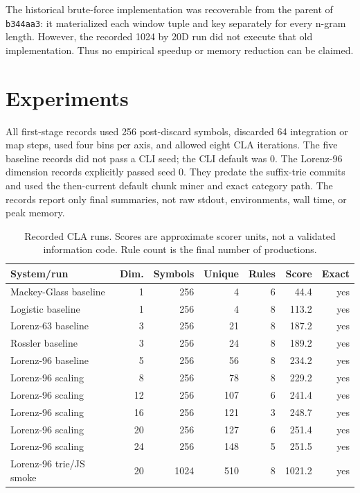 \documentclass[11pt]{article}
\begin{document}
The historical brute-force implementation was recoverable from the parent of
\texttt{b344aa3}: it materialized each window tuple and key separately for every
n-gram length. However, the recorded 1024 by 20D run did not execute that old
implementation. Thus no empirical speedup or memory reduction can be claimed.

\section{Experiments}

All first-stage records used 256 post-discard symbols, discarded 64 integration
or map steps, used four bins per axis, and allowed eight CLA iterations. The
five baseline records did not pass a CLI seed; the CLI default was 0. The
Lorenz-96 dimension records explicitly passed seed 0. They predate the
suffix-trie commits and used the then-current default chunk miner and exact
category path. The records report only final summaries, not raw stdout,
environments, wall time, or peak memory.

\begin{table}[ht]
\centering
\small
\begin{tabular}{lrrrrrr}
\toprule
System/run & Dim. & Symbols & Unique & Rules & Score & Exact \\
\midrule
Mackey-Glass baseline & 1 & 256 & 4 & 6 & 44.4 & yes \\
Logistic baseline & 1 & 256 & 4 & 8 & 113.2 & yes \\
Lorenz-63 baseline & 3 & 256 & 21 & 8 & 187.2 & yes \\
Rossler baseline & 3 & 256 & 24 & 8 & 189.2 & yes \\
Lorenz-96 baseline & 5 & 256 & 56 & 8 & 234.2 & yes \\
Lorenz-96 scaling & 8 & 256 & 78 & 8 & 229.2 & yes \\
Lorenz-96 scaling & 12 & 256 & 107 & 6 & 241.4 & yes \\
Lorenz-96 scaling & 16 & 256 & 121 & 3 & 248.7 & yes \\
Lorenz-96 scaling & 20 & 256 & 127 & 6 & 251.4 & yes \\
Lorenz-96 scaling & 24 & 256 & 148 & 5 & 251.5 & yes \\
Lorenz-96 trie/JS smoke & 20 & 1024 & 510 & 8 & 1021.2 & yes \\
\bottomrule
\end{tabular}
\caption{Recorded CLA runs. Scores are approximate scorer units, not a
validated information code. Rule count is the final number of productions.}
\label{tab:runs}
\end{table}
\end{document}
